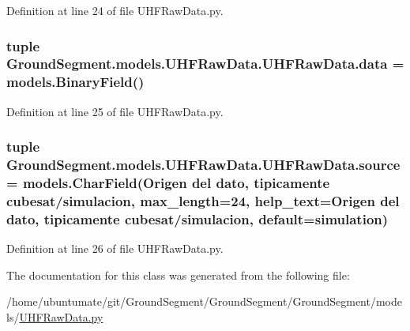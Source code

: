 Definition at line 24 of file U\+H\+F\+Raw\+Data.\+py.

\hypertarget{class_ground_segment_1_1models_1_1_u_h_f_raw_data_1_1_u_h_f_raw_data_a617ee1b3a10bfb1dbdad7f5e58ecd111}{}
\subsubsection[{data}]{\setlength{\rightskip}{0pt plus 5cm}tuple Ground\+Segment.\+models.\+U\+H\+F\+Raw\+Data.\+U\+H\+F\+Raw\+Data.\+data = models.\+Binary\+Field()\hspace{0.3cm}{\ttfamily [static]}}\label{class_ground_segment_1_1models_1_1_u_h_f_raw_data_1_1_u_h_f_raw_data_a617ee1b3a10bfb1dbdad7f5e58ecd111}


Definition at line 25 of file U\+H\+F\+Raw\+Data.\+py.

\hypertarget{class_ground_segment_1_1models_1_1_u_h_f_raw_data_1_1_u_h_f_raw_data_af793b6af185be9c8f4895d2600959b3e}{}
\subsubsection[{source}]{\setlength{\rightskip}{0pt plus 5cm}tuple Ground\+Segment.\+models.\+U\+H\+F\+Raw\+Data.\+U\+H\+F\+Raw\+Data.\+source = models.\+Char\+Field(\textquotesingle{}Origen del dato, tipicamente cubesat/simulacion\textquotesingle{}, max\+\_\+length=24, help\+\_\+text=\textquotesingle{}Origen del dato, tipicamente cubesat/simulacion\textquotesingle{}, default=\textquotesingle{}simulation\textquotesingle{})\hspace{0.3cm}{\ttfamily [static]}}\label{class_ground_segment_1_1models_1_1_u_h_f_raw_data_1_1_u_h_f_raw_data_af793b6af185be9c8f4895d2600959b3e}


Definition at line 26 of file U\+H\+F\+Raw\+Data.\+py.



The documentation for this class was generated from the following file\+:\begin{DoxyCompactItemize}
\item 
/home/ubuntumate/git/\+Ground\+Segment/\+Ground\+Segment/\+Ground\+Segment/models/\hyperlink{_u_h_f_raw_data_8py}{U\+H\+F\+Raw\+Data.\+py}\end{DoxyCompactItemize}
